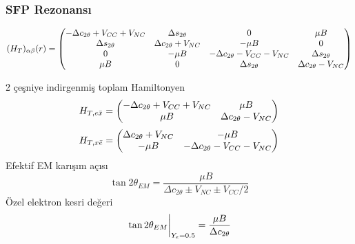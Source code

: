 \documentclass[10pt]{beamer}
\begin{document}
\begin{frame}[noframenumbering]
    \frametitle{SFP Rezonansı}
    \hrulefill
    
    \tiny
    \begin{equation*}
        (H_{T})_{\alpha\beta}(r) = \mqty(-\Delta c_{2\theta}+V_{CC}+V_{NC} & \Delta s_{2\theta} & 0 & \mu B\\\Delta s_{2\theta} & \Delta c_{2\theta} + V_{NC}& -\mu B & 0
        \\0 & -\mu B& -\Delta c_{2\theta}-V_{CC}-V_{NC} & \Delta s_{2\theta}\\ \mu B& 0 & \Delta s_{2\theta} & \Delta c_{2\theta}-V_{NC} )
    \end{equation*}
    \normalsize
    
    \hrulefill

    \begin{minipage}{0.45\textwidth}
        \footnotesize
        2 çeşniye indirgenmiş toplam Hamiltonyen
        \tiny
        \begin{equation*}
            H_{T,e\bar{x}} = \mqty(-\Delta c_{2\theta}+V_{CC}+V_{NC} & \mu B \\ \mu B & \Delta c_{2\theta}-V_{NC})
        \end{equation*}
        \begin{equation*}
	        H_{T,x\bar{e}} = \mqty(\Delta c_{2\theta}+V_{NC} & -\mu B \\ -\mu B & -\Delta c_{2\theta}-V_{CC}-V_{NC})
        \end{equation*}
        \footnotesize
        Efektif EM karışım açısı
        \begin{equation*}
            \tan 2\theta_{EM} = \frac{\mu B}{\Delta c_{2\theta} \pm V_{NC} \pm V_{CC}/2}
        \end{equation*}
        Özel elektron kesri değeri
        \begin{equation*}
            \eval{\tan 2\theta_{EM}}_{Y_{e}=0.5} = \frac{\mu B}{\Delta c_{2\theta}}
        \end{equation*}
        \normalsize
    \end{minipage}
    \hfill
    \begin{minipage}{0.45\textwidth}
        \begin{figure}[hbt!]
            \centering

\end{figure}
\end{minipage}
\end{frame}
\end{document}
